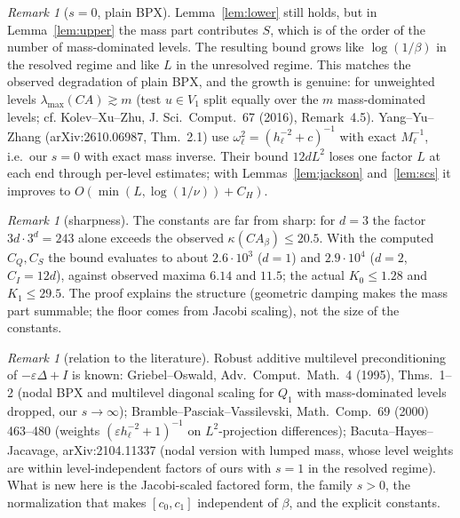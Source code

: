 \documentclass[11pt,a4paper]{article}
\theoremstyle{remark}
\newtheorem{remark}[theorem]{Remark}
\begin{document}
\begin{remark}[$s=0$, plain BPX]
Lemma~\ref{lem:lower} still holds, but in Lemma~\ref{lem:upper} the mass
part contributes $S$, which is of the order of the number of mass-dominated
levels. The resulting bound grows like $\log(1/\beta)$ in the resolved regime
and like $L$ in the unresolved regime. This matches the observed
degradation of plain BPX, and the growth is genuine: for unweighted levels
$\lambda_{\max}(CA)\gtrsim m$ (test $u\in V_1$ split equally over the $m$
mass-dominated levels; cf. Kolev--Xu--Zhu, J. Sci.\ Comput.\ 67 (2016),
Remark~4.5). Yang--Yu--Zhang (arXiv:2610.06987, Thm.~2.1) use
$\omega_\ell^2=(h_\ell^{-2}+c)^{-1}$ with exact $M_\ell^{-1}$, i.e.\ our $s=0$ with exact mass
inverse. Their bound $12dL^2$ loses one factor $L$ at each end through
per-level estimates; with Lemmas~\ref{lem:jackson} and~\ref{lem:scs} it improves
to $O(\min(L,\log(1/\nu))+C_H)$.
\end{remark}

\begin{remark}[sharpness]
The constants are far from sharp: for $d=3$ the factor $3d\cdot3^d=243$ alone
exceeds the observed $\kappa(CA_\beta)\le20.5$. With the computed $C_Q,C_S$ the
bound evaluates to about $2.6\cdot10^3$ ($d=1$) and $2.9\cdot10^4$ ($d=2$, $C_I=12d$),
against observed maxima $6.14$ and $11.5$; the actual $K_0\le1.28$ and
$K_1\le29.5$. The proof explains the structure
(geometric damping makes the mass part summable; the floor comes from
Jacobi scaling), not the size of the constants.
\end{remark}

\begin{remark}[relation to the literature]
Robust additive multilevel preconditioning of $-\varepsilon\Delta+I$ is known:
Griebel--Oswald, Adv.\ Comput.\ Math.\ 4 (1995), Thms.~1--2 (nodal BPX and
multilevel diagonal scaling for $Q_1$ with mass-dominated levels dropped,
our $s\to\infty$); Bramble--Pasciak--Vassilevski, Math.\ Comp.\ 69 (2000)
463--480 (weights $(\varepsilon h_\ell^{-2}+1)^{-1}$ on $L^2$-projection differences);
Bacuta--Hayes--Jacavage, arXiv:2104.11337 (nodal version with lumped mass,
whose level weights are within level-independent factors of ours with
$s=1$ in the resolved regime). What is new here is the Jacobi-scaled
factored form, the family $s>0$, the normalization that makes $[c_0,c_1]$
independent of $\beta$, and the explicit constants.
\end{remark}
\end{document}
